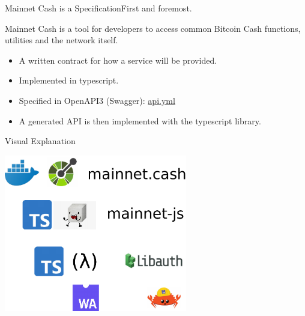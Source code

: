 \documentclass{beamer}
\begin{document}
\begin{frame}{Mainnet Cash is a Specification}{First and foremost.}

  Mainnet Cash is a tool for developers to access common Bitcoin Cash functions, utilities and the network itself.
  \begin{itemize}
  \item
    A written contract for how a service will be provided.
  \item
    Implemented in typescript.
  \item
    Specified in OpenAPI3 (Swagger): \href{https://rest-unstable.mainnet.cash/api-docs/}{api.yml}
    \item
    A generated API is then implemented with the typescript library.
    
  \end{itemize}
\end{frame}

\begin{frame}{Visual Explanation}{}

  \includegraphics[width=0.6\textwidth, angle=0]{stack.pdf}
\end{frame}
\end{document}
